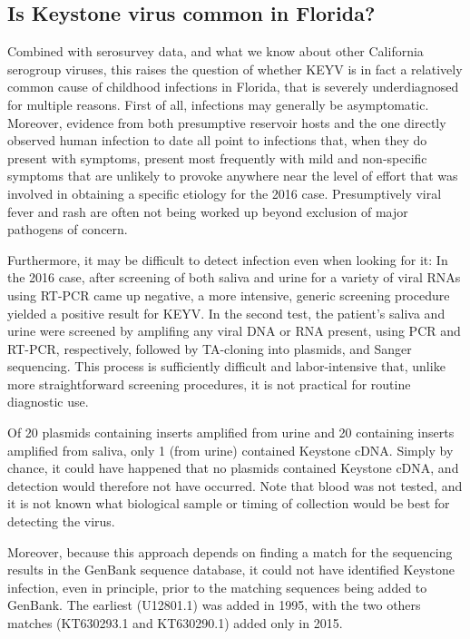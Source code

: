 \documentclass[12pt]{article}
\begin{document}
        \subsection{Is Keystone virus common in Florida?}
            \label{raises-the-question}
            Combined with serosurvey data, and what we know about other California serogroup viruses, this raises the question of whether KEYV is in fact a relatively common cause of childhood infections in Florida, that is severely underdiagnosed for multiple reasons. First of all, infections may generally be asymptomatic. Moreover, evidence from both presumptive reservoir hosts and the one directly observed human infection to date all point to infections that, when they do present with symptoms, present most frequently with mild and non-specific symptoms that are unlikely to provoke anywhere near the level of effort that was involved in obtaining a specific etiology for the 2016 case. Presumptively viral fever and rash are often not being worked up beyond exclusion of major pathogens of concern.
        
            Furthermore, it may be difficult to detect infection even when looking for it: In the 2016 case, after screening of both saliva and urine for a variety of viral RNAs using RT-PCR came up negative, a more intensive, generic screening procedure yielded a positive result for KEYV.  In the second test, the patient's saliva and urine were screened by amplifing any viral DNA or RNA present, using PCR and RT-PCR, respectively, followed by TA-cloning into plasmids, and Sanger sequencing\cite{lednicky2018keystone}. This process is sufficiently difficult and labor-intensive that, unlike more straightforward screening procedures, it is not practical for routine diagnostic use.\cite{lednicky2019personal}

            Of 20 plasmids containing inserts amplified from urine and 20 containing inserts amplified from saliva, only 1 (from urine) contained Keystone cDNA. Simply by chance, it could have happened that no plasmids contained Keystone cDNA, and detection would therefore not have occurred. Note that blood was not tested, and it is not known what biological sample or timing of collection would be best for detecting the virus.
            
            Moreover, because this approach depends on finding a match for the sequencing results in the GenBank sequence database, it could not have identified Keystone infection, even in principle, prior to the matching sequences being added to GenBank.  The earliest (U12801.1) was added in 1995\cite{genbankU12801.1}, with the two others matches (KT630293.1 and KT630290.1) added only in 2015\cite{genbankKT630293.1,genbankKT630290.1}.
\end{document}
